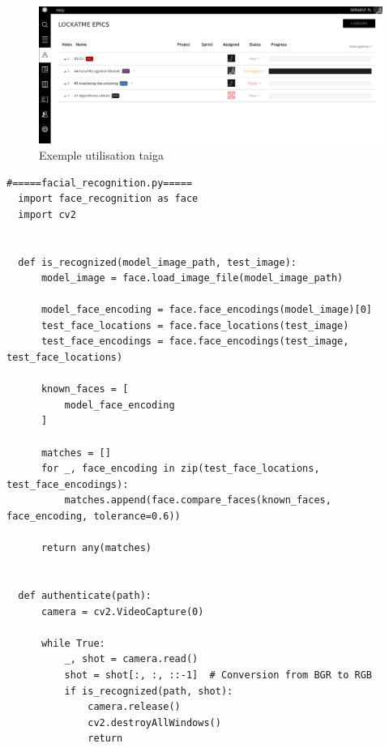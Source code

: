 \documentclass[french]{report}
\begin{document}
\begin{figure}[h]\label{fig:Taiga}
  \includegraphics[width=\linewidth]{taiga}
  \caption{Exemple utilisation taiga}
  \label{fig:Taiga}
\end{figure}

\newpage

\begin{verbatim}
#=====facial_recognition.py=====
  import face_recognition as face
  import cv2


  def is_recognized(model_image_path, test_image):
      model_image = face.load_image_file(model_image_path)

      model_face_encoding = face.face_encodings(model_image)[0]
      test_face_locations = face.face_locations(test_image)
      test_face_encodings = face.face_encodings(test_image, test_face_locations)

      known_faces = [
          model_face_encoding
      ]

      matches = []
      for _, face_encoding in zip(test_face_locations, test_face_encodings):
          matches.append(face.compare_faces(known_faces, face_encoding, tolerance=0.6))

      return any(matches)


  def authenticate(path):
      camera = cv2.VideoCapture(0)

      while True:
          _, shot = camera.read()
          shot = shot[:, :, ::-1]  # Conversion from BGR to RGB
          if is_recognized(path, shot):
              camera.release()
              cv2.destroyAllWindows()
              return
\end{verbatim}

\newpage
\end{document}
